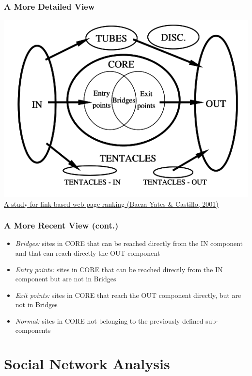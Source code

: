\documentclass{beamer}
\begin{document}
\begin{frame}
    \frametitle{A More Detailed View}    
    \centering
    \includegraphics[width=\linewidth]{webgraph2}\\[-3ex]
    \footnotesize\href{http://doi.ieeecomputersociety.org/10.1109/SPIRE.2001.10012}{A
      study for link based web page ranking (Baeza-Yates \& Castillo, 2001)}
\end{frame}

\begin{frame}
    \frametitle{A More Recent View (cont.)}
    \begin{itemize}
    \item \emph{Bridges:} sites in CORE that can be reached directly from the IN
        component and that can reach directly the OUT component
    \item \emph{Entry points:} sites in CORE that can be reached directly from
        the IN component but are not in Bridges
    \item \emph{Exit points:} sites in CORE that reach the OUT component
        directly, but are not in Bridges
    \item \emph{Normal:} sites in CORE not belonging to the previously defined
        sub-components
    \end{itemize}
\end{frame}


\section{Social Network Analysis}
\end{document}
